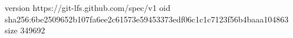 version https://git-lfs.github.com/spec/v1
oid sha256:6be2509652b107fa6ee2c61573e59453373edf06c1c1c7123f56b4baaa104863
size 349692
